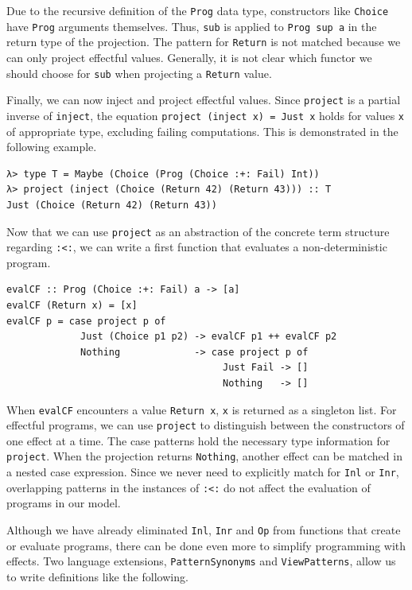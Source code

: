 \documentclass[a4paper, 11pt, fleqn, twoside]{scrreprt}
\newcommand{\hinl}[1]{\texttt{#1}}
\newcommand{\cinl}[1]{\texttt{#1}}
\begin{document}
Due to the recursive definition of the \hinl{Prog} data type, constructors like \hinl{Choice} have \hinl{Prog} arguments themselves.
Thus, \hinl{sub} is applied to \hinl{Prog sup a} in the return type of the projection.
The pattern for \cinl{Return} is not matched because we can only project effectful values.
Generally, it is not clear which functor we should choose for \hinl{sub} when projecting a \hinl{Return} value.

Finally, we can now inject and project effectful values.
Since \hinl{project} is a partial inverse of \hinl{inject}, the equation \hinl{project (inject x) = Just x} holds for values \hinl{x} of appropriate type, excluding failing computations.
This is demonstrated in the following example.

\begin{verbatim}
λ> type T = Maybe (Choice (Prog (Choice :+: Fail) Int))
λ> project (inject (Choice (Return 42) (Return 43))) :: T
Just (Choice (Return 42) (Return 43))
\end{verbatim}

Now that we can use \hinl{project} as an abstraction of the concrete term structure regarding \hinl{:<:}, we can write a first function that evaluates a non-deterministic program.

\begin{verbatim}
evalCF :: Prog (Choice :+: Fail) a -> [a]
evalCF (Return x) = [x]
evalCF p = case project p of
             Just (Choice p1 p2) -> evalCF p1 ++ evalCF p2
             Nothing             -> case project p of
                                      Just Fail -> []
                                      Nothing   -> []
\end{verbatim}

When \hinl{evalCF} encounters a value \hinl{Return x}, \hinl{x} is returned as a singleton list.
For effectful programs, we can use \hinl{project} to distinguish between the constructors of one effect at a time.
The case patterns hold the necessary type information for \hinl{project}.
When the projection returns \hinl{Nothing}, another effect can be matched in a nested case expression.
Since we never need to explicitly match for \hinl{Inl} or \hinl{Inr}, overlapping patterns in the instances of \hinl{:<:} do not affect the evaluation of programs in our model.

Although we have already eliminated \hinl{Inl}, \hinl{Inr} and \hinl{Op} from functions that create or evaluate programs, there can be done even more to simplify programming with effects.
Two language extensions, \hinl{PatternSynonyms} and \hinl{ViewPatterns}, allow us to write definitions like the following.
\end{document}

